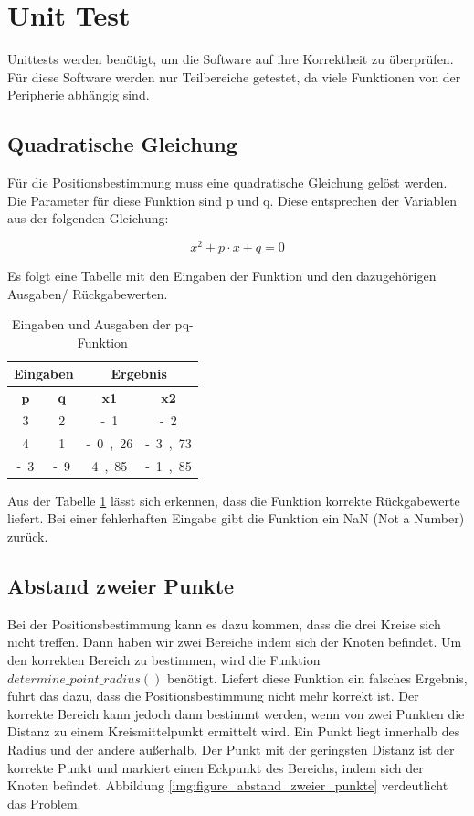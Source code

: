 \newpage
\section{Unit Test}
Unittests werden benötigt, um die Software auf ihre Korrektheit zu überprüfen. Für diese Software werden nur Teilbereiche getestet, da viele Funktionen von der Peripherie abhängig sind.

\subsection{Quadratische Gleichung}
Für die Positionsbestimmung muss eine quadratische Gleichung gelöst werden. Die Parameter für diese Funktion sind \si{p} und \si{q}. Diese entsprechen der Variablen aus der folgenden Gleichung:

\begin{equation}
\label{eq:unit_test_pq_formel}
x^{2} + p \cdot x + q = 0
\end{equation}

Es folgt eine Tabelle mit den Eingaben der Funktion und den dazugehörigen Ausgaben/ Rückgabewerten. 

\begin{table}[H]
\centering
\caption{Eingaben und Ausgaben der pq-Funktion}
\label{table:pq_funktion}
\begin{tabular}{|c|c|c|c|}
\hline
\multicolumn{2}{|c|}{\textbf{Eingaben}} & \multicolumn{2}{c|}{\textbf{Ergebnis}} \\ \hline
\textbf{$\mathbf{p}$}         & \textbf{$\mathbf{q}$}         & \textbf{$\mathbf{x1}$}        & \textbf{$\mathbf{x2}$}       \\ \hline
\si{3}	 & 	\si{2}	 & 	\si{-1}	 & 	\si{-2}	 \\ \hline
\si{4}	 & 	\si{1}	 & 	\si{-0,26}	 & 	\si{-3,73}	 \\ \hline
\si{-3}	 & 	\si{-9}	 & 	\si{4,85}	 & 	\si{-1,85}	 \\ \hline
\end{tabular}
\end{table}


Aus der Tabelle \ref{table:pq_funktion} lässt sich erkennen, dass die Funktion korrekte Rückgabewerte liefert. Bei einer fehlerhaften Eingabe gibt die Funktion ein \si{NaN} (Not a Number) zurück.


\subsection{Abstand zweier Punkte}
Bei der Positionsbestimmung kann es dazu kommen, dass die drei Kreise sich nicht treffen. Dann haben wir zwei Bereiche indem sich der Knoten befindet. Um den korrekten Bereich zu bestimmen, wird die Funktion $determine\_point\_radius()$ benötigt. Liefert diese Funktion ein falsches Ergebnis, führt das dazu, dass die Positionsbestimmung nicht mehr korrekt ist. Der korrekte Bereich kann jedoch dann bestimmt werden, wenn von zwei Punkten die Distanz zu einem Kreismittelpunkt ermittelt wird. Ein Punkt liegt innerhalb des Radius und der andere außerhalb. Der Punkt mit der geringsten Distanz ist der korrekte Punkt und markiert einen Eckpunkt des Bereichs, indem sich der Knoten befindet. Abbildung \ref{img:figure_abstand_zweier_punkte} verdeutlicht das Problem.

